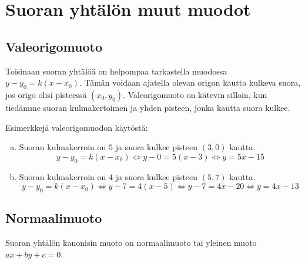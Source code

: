 \section{Suoran yhtälön muut muodot}


\subsection*{Valeorigomuoto} %

Toisinaan suoran yhtälöä on helpompaa tarkastella muodossa $y-y_0=k(x-x_0)$.
Tämän voidaan ajatella olevan origon kautta kulkeva suora, jos origo olisi
pisteessä $(x_0, y_0)$. Valeorigomuoto on kätevin silloin, kun tiedämme suoran
kulmakertoimen ja yhden pisteen, jonka kautta suora kulkee.

\begin{esimerkki}
    Esimerkkejä valeorigomuodon käytöstä:
    \begin{enumerate}[a)]
        \item Suoran kulmakerroin on $5$ ja suora kulkee pisteen $(3,0)$ kautta.
        \[y-y_0 = k(x-x_0) \Leftrightarrow y-0 = 5(x-3) \Leftrightarrow y = 5x-15\]
        \item Suoran kulmakerroin on $4$ ja suora kulkee pisteen $(5,7)$ kautta.
        \[y-y_0 = k(x-x_0) \Leftrightarrow y-7 = 4(x-5) \Leftrightarrow y-7 = 4x-20 \Leftrightarrow y = 4x-13\]
    \end{enumerate}
\end{esimerkki}

\subsection*{Normaalimuoto}

Suoran yhtälön kanonisin muoto on normaalimuoto tai yleinen muoto $ax+by+c=0$.
